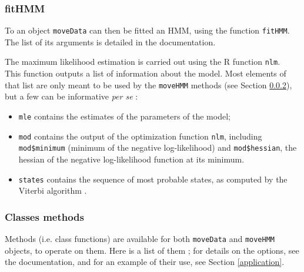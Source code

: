 \documentclass[]{article}
\begin{document}
\subsubsection{fitHMM}
To an object \texttt{moveData} can then be fitted an HMM, using the function \texttt{fitHMM}. The list of its arguments is detailed in the documentation.

The maximum likelihood estimation is carried out using the R function \texttt{nlm}.\\

This function outputs a list of information about the model. Most elements of that list are only meant to be used by the \texttt{moveHMM} methods (see Section \ref{methods}), but a few can be informative \textit{per se} :
\begin{itemize}
	\item \texttt{mle} contains the estimates of the parameters of the model;
	\item \texttt{mod} contains the output of the optimization function \texttt{nlm}, including \texttt{mod\$minimum} (minimum of the negative log-likelihood) and \texttt{mod\$hessian}, the hessian of the negative log-likelihood function at its minimum.
	\item \texttt{states} contains the sequence of most probable states, as computed by the Viterbi algorithm \citep{zucchini2009}.
\end{itemize}

\subsubsection{Classes methods} \label{methods}
Methods (i.e. class functions) are available for both \texttt{moveData} and \texttt{moveHMM} objects, to operate on them. Here is a list of them ; for details on the options, see the documentation, and for an example of their use, see Section \ref{application}.
\end{document}
